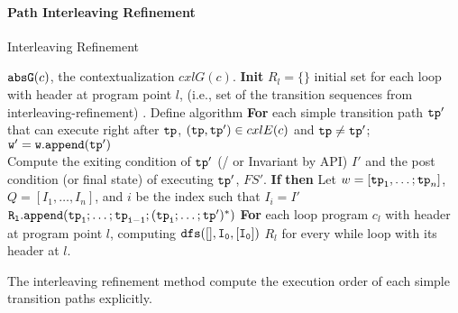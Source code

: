 \paragraph{Path Interleaving Refinement}
\begin{algorithm}
  \caption{
  {Interleaving Refinement}
  \label{alg:prog-refine}
  }
  \begin{algorithmic}[1]
  \REQUIRE $\mathtt{abs}{\mathtt{G}}(c)$, the contextualization $cxlG(c)$.
  \STATE  \textbf{Init} 
  $R_l = \{\}$ initial set for each loop with header at program point $l$, (i.e., set of the transition sequences from interleaving-refinement) .
  \STATE Define algorithm 
  \STATE {}
  \STATE \quad \textbf{For} each simple transition path $\mathtt{tp}'$ that can execute right after $\mathtt{tp}$,
  $(\mathtt{tp}, \mathtt{tp}') \in cxlE(c)$ and $\mathtt{tp} \neq \mathtt{tp}'$;
  \\
  \STATE \quad \quad $\mathtt{w' = w.append(\mathtt{tp}')}$
  \\
  \quad \quad {}
  \STATE  \quad \quad Compute the exiting condition of $\mathtt{tp}'$ (/ or Invariant by  API) $I'$ and the 
  post condition (or final state) of executing $\mathtt{tp}'$, $FS'$.
  \STATE \quad \quad \textbf{If} 
  \STATE \quad \quad \textbf{then}
  Let $w = [\mathtt{tp}_1, \ldots; \mathtt{tp}_n]$, $Q = [I_1, \ldots, I_n]$, and $i$ be the index such that $I_i = I'$
  \\ \quad \quad \quad \quad \quad
  $\mathtt{R_l.append(\mathtt{tp}_1; \ldots; \mathtt{tp}_{i - 1}; (\mathtt{tp}_i; \ldots; \mathtt{tp}')^*)}$
  \STATE \quad \quad  {}
    \STATE \textbf{For} each loop program $c_{l}$ with header at program point $l$, 
    \STATE \quad {}
    \STATE \quad computing $\mathtt{dfs([], I_0, [I_0] )}$
  \RETURN $R_l$ for every while loop with its header at $l$.
  \end{algorithmic}
  \end{algorithm}



The interleaving refinement method compute the execution order of each simple transition paths explicitly.

